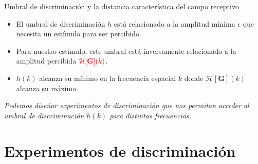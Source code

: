 \documentclass[
    11pt, %
    aspectratio=169, %
]{beamer}
\begin{document}

    
   


\begin{frame}{Umbral de discriminación y la distancia característica del campo receptivo}
\begin{itemize}
    \item El umbral de discriminación $h$ está relacionado a la amplitud mínima $\epsilon$ que necesita un estímulo para ser percibido.
    \item Para nuestro estímulo, este umbral está inversamente relacionado a la amplitud percibida $\color{red}\mathcal{H}[\mathbf{G}](k)$.
    \item $h(k)$ alcanza su mínimo en la frecuencia espacial $k$ donde $\mathcal{H}[\mathbf{G}](k)$ alcanza su máximo.
\end{itemize}

\begin{block}{}
    
   \emph{Podemos diseñar experimentos de discriminación que nos permitan acceder al umbral de discriminación $h(k)$ para distintas frecuencias.}
    	\end{block}

\end{frame}



\section{Experimentos de discriminación}
\end{document}
